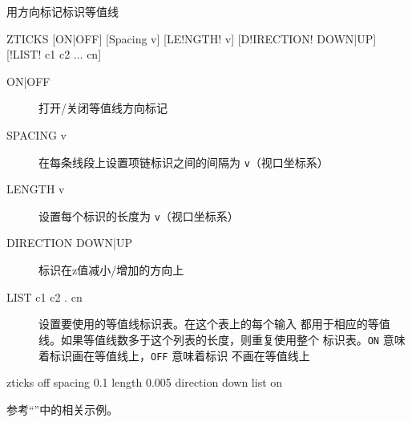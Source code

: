 \label{cmd:zticks}

用方向标记标识等值线

\begin{SACSTX}
ZTICKS [ON|OFF] [Spacing v] [LE!NGTH! v] [D!IRECTION! DOWN|UP] [!LIST! c1 c2 ... cn]
\end{SACSTX}

\begin{description}
\item [ON|OFF] 打开/关闭等值线方向标记
\item [SPACING v] 在每条线段上设置项链标识之间的间隔为 \texttt{v}（视口坐标系）
\item [LENGTH v] 设置每个标识的长度为 \texttt{v}（视口坐标系）
\item [DIRECTION DOWN|UP] 标识在z值减小/增加的方向上
\item [LIST c1 c2 . cn] 设置要使用的等值线标识表。在这个表上的每个输入
    都用于相应的等值线。如果等值线数多于这个列表的长度，则重复使用整个
    标识表。\texttt{ON} 意味着标识画在等值线上，\texttt{OFF} 意味着标识
    不画在等值线上
\end{description}

\begin{SACDFT}
zticks off spacing 0.1 length 0.005 direction down list on
\end{SACDFT}

参考``''中的相关示例。
